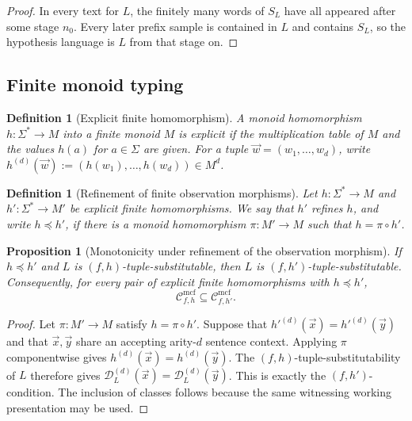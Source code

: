 \documentclass[11pt,a4paper]{article}
\newtheorem{proposition}[theorem]{Proposition}
\newtheorem{definition}[theorem]{Definition}
\theoremstyle{remark}
\newcommand{\Cmcf}[2]{\mathcal{C}^{\mathrm{mcf}}_{#1,#2}}
\newcommand{\D}{\mathcal{D}}
\newcommand{\tuple}[1]{\vec{#1}}
\begin{document}
\begin{proof}
In every text for \(L\), the finitely many words of \(S_L\) have all appeared
after some stage \(n_0\).  Every later prefix sample is contained in \(L\) and
contains \(S_L\), so the hypothesis language is \(L\) from that stage on.
\end{proof}

\subsection{Finite monoid typing}

\begin{definition}[Explicit finite homomorphism]
A monoid homomorphism \(h\colon\Sigma^*\to M\) into a finite monoid \(M\) is
\emph{explicit} if the multiplication table of \(M\) and the values \(h(a)\) for
\(a\in\Sigma\) are given.  For a tuple \(\tuple w=(w_1,\ldots,w_d)\), write
\(h^{(d)}(\tuple w):=(h(w_1),\ldots,h(w_d))\in M^d\).
\end{definition}

\begin{definition}[Refinement of finite observation morphisms]
\label{def:h-refinement}
Let \(h\colon\Sigma^*\to M\) and \(h'\colon\Sigma^*\to M'\) be explicit finite
homomorphisms.  We say that \(h'\) \emph{refines} \(h\), and write
\(h\preceq h'\), if there is a monoid homomorphism
\(\pi\colon M'\to M\) such that \(h=\pi\circ h'\).
\end{definition}

\begin{proposition}[Monotonicity under refinement of the observation morphism]
\label{prop:h-refinement-monotonicity}
If \(h\preceq h'\) and \(L\) is \((f,h)\)-tuple-substitutable, then \(L\) is
\((f,h')\)-tuple-substitutable.  Consequently, for every pair of explicit finite
homomorphisms with \(h\preceq h'\),
\[
  \Cmcf{f}{h}\subseteq \Cmcf{f}{h'} .
\]
\end{proposition}

\begin{proof}
Let \(\pi\colon M'\to M\) satisfy \(h=\pi\circ h'\).  Suppose that
\(h'^{(d)}(\tuple x)=h'^{(d)}(\tuple y)\) and that \(\tuple x,\tuple y\) share an
accepting arity-\(d\) sentence context.  Applying \(\pi\) componentwise gives
\(h^{(d)}(\tuple x)=h^{(d)}(\tuple y)\).  The \((f,h)\)-tuple-substitutability of
\(L\) therefore gives \(\D_L^{(d)}(\tuple x)=\D_L^{(d)}(\tuple y)\).  This is
exactly the \((f,h')\)-condition.  The inclusion of classes follows because the
same witnessing working presentation may be used.
\end{proof}
\end{document}

